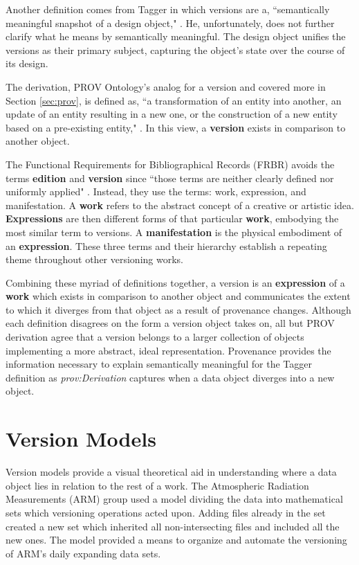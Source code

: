Another definition comes from Tagger in which versions are a, ``semantically meaningful snapshot of a design object," \cite{Tagger2005}.
He, unfortunately, does not further clarify what he means by semantically meaningful.
The design object unifies the versions as their primary subject, capturing the object's state over the course of its design.

The derivation, PROV Ontology's analog for a version and covered more in Section \ref{sec:prov}, is defined as, ``a transformation of an entity into another, an update of an entity resulting in a new one, or the construction of a new entity based on a pre-existing entity," \cite{Lebo2013}.
In this view, a \textbf{version} exists in comparison to another object.

The Functional Requirements for Bibliographical Records (FRBR) avoids the terms \textbf{edition} and \textbf{version} since ``those terms are neither clearly defined nor uniformly applied" \cite{frbr}.
Instead, they use the terms: work, expression, and manifestation.
A \textbf{work} refers to the abstract concept of a creative or artistic idea.
\textbf{Expressions} are then different forms of that particular \textbf{work}, embodying the most similar term to versions.
A \textbf{manifestation} is the physical embodiment of an \textbf{expression}.
These three terms and their hierarchy establish a repeating theme throughout other versioning works.

Combining these myriad of definitions together, a version is an \textbf{expression} of a \textbf{work} which exists in comparison to another object and communicates the extent to which it diverges from that object as a result of provenance changes.
Although each definition disagrees on the form a version object takes on, all but PROV derivation agree that a version belongs to a larger collection of objects implementing a more abstract, ideal representation.
Provenance provides the information necessary to explain semantically meaningful for the Tagger definition as \textit{prov:Derivation} captures when a data object diverges into a new object.


\section{Version Models} \label{sec:models}

Version models provide a visual theoretical aid in understanding where a data object lies in relation to the rest of a work.
The Atmospheric Radiation Measurements (ARM) group used a model dividing the data into mathematical sets which versioning operations acted upon\cite{6906868}.
Adding files already in the set created a new set which inherited all non-intersecting files and included all the new ones.
The model provided a means to organize and automate the versioning of ARM's daily expanding data sets.

